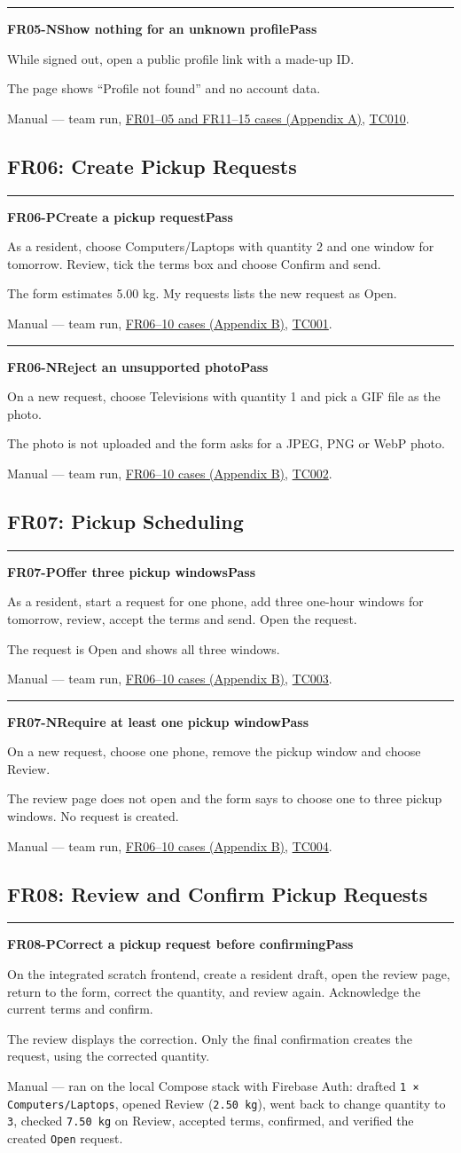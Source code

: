 \documentclass[11pt]{article}
\newcommand{\code}[1]{\texttt{#1}}
\newcommand{\passtag}{\textbf{\color{passgreen}Pass}}
\newcommand{\testcase}[6]{%
  \par\addvspace{10pt}
  \noindent\rule{\linewidth}{0.4pt}\par\nopagebreak
  \phantomsection\label{#1}\textbf{#1\quad #2}\hfill #3\par\nopagebreak
  \begin{description}[style=nextline,leftmargin=1.2em,itemsep=2pt,topsep=2pt,font=\normalfont\itshape]
    \item[Setup and steps] #4
    \item[Expected result] #5
    \item[How it was checked] #6
  \end{description}}
\begin{document}
\filbreak
\testcase{FR05-N}{Show nothing for an unknown profile}{\passtag}
  {While signed out, open a public profile link with a made-up ID.}
  {The page shows “Profile not found” and no account data.}
  {Manual --- team run, \hyperref[app:A]{FR01--05 and FR11--15 cases (Appendix A)}, \hyperlink{tc:A10}{TC010}.}

\filbreak
\subsection{FR06: Create Pickup Requests}\label{FR06}
\testcase{FR06-P}{Create a pickup request}{\passtag}
  {As a resident, choose Computers/Laptops with quantity 2 and one window for tomorrow. Review, tick the terms box and choose Confirm and send.}
  {The form estimates 5.00 kg. My requests lists the new request as Open.}
  {Manual --- team run, \hyperref[app:B]{FR06--10 cases (Appendix B)}, \hyperlink{tc:B01}{TC001}.}

\filbreak
\testcase{FR06-N}{Reject an unsupported photo}{\passtag}
  {On a new request, choose Televisions with quantity 1 and pick a GIF file as the photo.}
  {The photo is not uploaded and the form asks for a JPEG, PNG or WebP photo.}
  {Manual --- team run, \hyperref[app:B]{FR06--10 cases (Appendix B)}, \hyperlink{tc:B02}{TC002}.}

\filbreak
\subsection{FR07: Pickup Scheduling}\label{FR07}
\testcase{FR07-P}{Offer three pickup windows}{\passtag}
  {As a resident, start a request for one phone, add three one-hour windows for tomorrow, review, accept the terms and send. Open the request.}
  {The request is Open and shows all three windows.}
  {Manual --- team run, \hyperref[app:B]{FR06--10 cases (Appendix B)}, \hyperlink{tc:B03}{TC003}.}

\filbreak
\testcase{FR07-N}{Require at least one pickup window}{\passtag}
  {On a new request, choose one phone, remove the pickup window and choose Review.}
  {The review page does not open and the form says to choose one to three pickup windows. No request is created.}
  {Manual --- team run, \hyperref[app:B]{FR06--10 cases (Appendix B)}, \hyperlink{tc:B04}{TC004}.}

\filbreak
\subsection{FR08: Review and Confirm Pickup Requests}\label{FR08}
\testcase{FR08-P}{Correct a pickup request before confirming}{\passtag}
  {On the integrated scratch frontend, create a resident draft, open the review page, return to the form, correct the quantity, and review again. Acknowledge the current terms and confirm.}
  {The review displays the correction. Only the final confirmation creates the request, using the corrected quantity.}
  {Manual --- ran on the local Compose stack with Firebase Auth: drafted \code{1 × Computers/Laptops}, opened Review (\code{2.50 kg}), went back to change quantity to \code{3}, checked \code{7.50 kg} on Review, accepted terms, confirmed, and verified the created \code{Open} request.}
\end{document}
